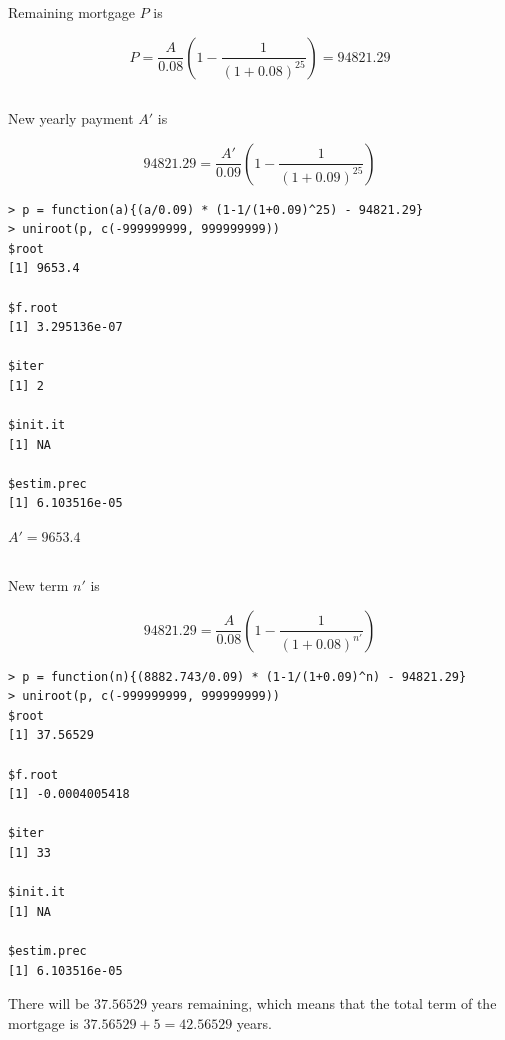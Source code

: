 \documentclass[11pt]{scrartcl}
\begin{document}
Remaining mortgage $P$ is

\[P = \frac{A}{0.08}\left(1 - \frac{1}{(1+0.08)^{25}}\right) = 94821.29\]

\subsection{}

New yearly payment $A'$ is

\[94821.29 = \frac{A'}{0.09}\left(1 - \frac{1}{(1+0.09)^{25}}\right)\]

\begin{lstlisting}
> p = function(a){(a/0.09) * (1-1/(1+0.09)^25) - 94821.29}
> uniroot(p, c(-999999999, 999999999))
$root
[1] 9653.4

$f.root
[1] 3.295136e-07

$iter
[1] 2

$init.it
[1] NA

$estim.prec
[1] 6.103516e-05
\end{lstlisting}

$A' = 9653.4$

\subsection{}

New term $n'$ is

\[94821.29 = \frac{A}{0.08}\left(1 - \frac{1}{(1+0.08)^{n'}}\right)\]

\begin{lstlisting}
> p = function(n){(8882.743/0.09) * (1-1/(1+0.09)^n) - 94821.29}
> uniroot(p, c(-999999999, 999999999))
$root
[1] 37.56529

$f.root
[1] -0.0004005418

$iter
[1] 33

$init.it
[1] NA

$estim.prec
[1] 6.103516e-05
\end{lstlisting}

There will be $37.56529$ years remaining, which means that the total term of the mortgage is $37.56529 + 5 = 42.56529$ years.

\section{}

\subsection{}
\end{document}
